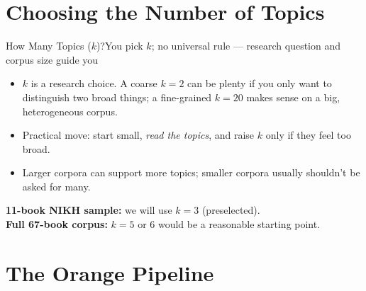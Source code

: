 \documentclass[aspectratio=169,10pt]{beamer}
\begin{document}
\section{Choosing the Number of Topics}

\begin{frame}{How Many Topics ($k$)?}{You pick $k$; no universal rule --- research question and corpus size guide you}
  \begin{itemize}
    \item $k$ is a research choice. A coarse $k=2$ can be plenty if you only want to distinguish two broad things; a fine-grained $k=20$ makes sense on a big, heterogeneous corpus.
    \item Practical move: start small, \emph{read the topics}, and raise $k$ only if they feel too broad.
    \item Larger corpora can support more topics; smaller corpora usually shouldn't be asked for many.
  \end{itemize}

  \vspace{0.4em}
  \begin{callblue}
    \textbf{11-book NIKH sample:} we will use \textbf{$k=3$} (preselected).\\
    \textbf{Full 67-book corpus:} \textbf{$k=5$} or \textbf{$6$} would be a reasonable starting point.
  \end{callblue}
\end{frame}

\section{The Orange Pipeline}
\end{document}
